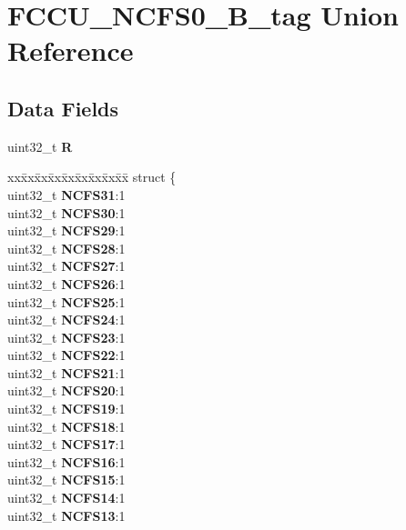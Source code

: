 \hypertarget{unionFCCU__NCFS0__32B__tag}{}\section{F\+C\+C\+U\+\_\+\+N\+C\+F\+S0\+\_\+B\+\_\+tag Union Reference}
\label{unionFCCU__NCFS0__32B__tag}
\subsection*{Data Fields}
\begin{DoxyCompactItemize}
\item 
\mbox{\label{unionFCCU__NCFS0__32B__tag_a894a2ba5e11119a26821514bd4268cad}} 
uint32\+\_\+t {\bfseries R}
\item 
\mbox{\label{unionFCCU__NCFS0__32B__tag_af0144fb81d7718bcc90cacc5d0aec97e}} 
\begin{tabbing}
xx\=xx\=xx\=xx\=xx\=xx\=xx\=xx\=xx\=\kill
struct \{\\
\>uint32\_t {\bfseries NCFS31}:1\\
\>uint32\_t {\bfseries NCFS30}:1\\
\>uint32\_t {\bfseries NCFS29}:1\\
\>uint32\_t {\bfseries NCFS28}:1\\
\>uint32\_t {\bfseries NCFS27}:1\\
\>uint32\_t {\bfseries NCFS26}:1\\
\>uint32\_t {\bfseries NCFS25}:1\\
\>uint32\_t {\bfseries NCFS24}:1\\
\>uint32\_t {\bfseries NCFS23}:1\\
\>uint32\_t {\bfseries NCFS22}:1\\
\>uint32\_t {\bfseries NCFS21}:1\\
\>uint32\_t {\bfseries NCFS20}:1\\
\>uint32\_t {\bfseries NCFS19}:1\\
\>uint32\_t {\bfseries NCFS18}:1\\
\>uint32\_t {\bfseries NCFS17}:1\\
\>uint32\_t {\bfseries NCFS16}:1\\
\>uint32\_t {\bfseries NCFS15}:1\\
\>uint32\_t {\bfseries NCFS14}:1\\
\>uint32\_t {\bfseries NCFS13}:1\\

\end{tabbing}
\end{DoxyCompactItemize}
